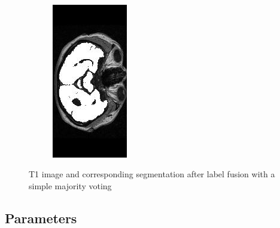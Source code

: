 \documentclass[11pt,a4paper,oneside]{report}
\begin{document}
\begin{figure}[H]
\begin{subfigure}[b]{0.3\textwidth}
        \end{subfigure}
        ~~~~ %
        \begin{subfigure}[b]{0.3\textwidth}
                \includegraphics[width=\textwidth, height=\textwidth, trim=0 20 0 20, clip=true, angle=90 ]{figures/diff/t1Seg_z.jpg}
        \end{subfigure}
        \caption{T1 image and corresponding segmentation after label fusion with a simple majority voting}\label{fig:segOverlay}
\end{figure}


\subsection*{Parameters}
\end{document}
